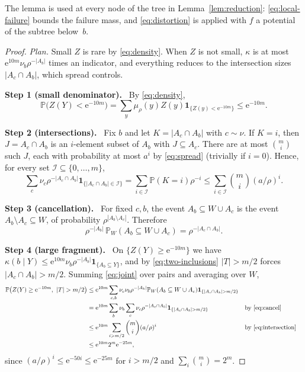 \documentclass[11pt]{article}
\numberwithin{equation}{section}
\newcommand{\PP}{\mathbb P}
\newcommand{\ind}{\mathbf 1}
\newcommand{\ee}{\mathrm e}
\newcommand{\step}[1]{\par\smallskip\noindent\textbf{Step #1.}\ }
\begin{document}
The lemma is used at every node of the tree in Lemma~\ref{lem:reduction}:
\eqref{eq:local-failure} bounds the failure mass, and
\eqref{eq:distortion} is applied with $f$ a potential of the subtree
below~$b$.

\begin{proof}
\emph{Plan.} Small $Z$ is rare by \eqref{eq:density}. When $Z$ is not
small, $\kappa$ is at most $\ee^{10m}\nu_b\rho^{-|A_b|}$ times an
indicator, and everything reduces to the intersection sizes
$|A_c\cap A_b|$, which spread controls.

\step{1 (small denominator)} By \eqref{eq:density},
\[
 \PP\bigl(Z(Y)<\ee^{-10m}\bigr)
 =\sum_{y}\mu_\rho(y)Z(y)\ind_{\{Z(y)<\ee^{-10m}\}}\le\ee^{-10m}.
\]

\step{2 (intersections)} Fix $b$ and let $K=|A_c\cap A_b|$ with
$c\sim\nu$. If $K=i$, then $J=A_c\cap A_b$ is an $i$-element subset of
$A_b$ with $J\subseteq A_c$. There are at most $\binom mi$ such $J$, each
with probability at most $a^i$ by \eqref{eq:spread} (trivially if $i=0$).
Hence, for every set $\mathcal I\subseteq\{0,\ldots,m\}$,
\begin{equation}\label{eq:intersection}
 \sum_c\nu_c\rho^{-|A_c\cap A_b|}\ind_{\{|A_c\cap A_b|\in\mathcal I\}}
 =\sum_{i\in\mathcal I}\PP(K=i)\rho^{-i}
 \le\sum_{i\in\mathcal I}\binom mi(a/\rho)^i.
\end{equation}

\step{3 (cancellation)} For fixed $c,b$, the event
$A_b\subseteq W\cup A_c$ is the event $A_b\setminus A_c\subseteq W$, of
probability $\rho^{|A_b\setminus A_c|}$. Therefore
\begin{equation}\label{eq:cancel}
 \rho^{-|A_b|}\,\PP_W(A_b\subseteq W\cup A_c)=\rho^{-|A_c\cap A_b|}.
\end{equation}

\step{4 (large fragment)} On $\{Z(Y)\ge\ee^{-10m}\}$ we have
$\kappa(b\mid Y)\le\ee^{10m}\nu_b\rho^{-|A_b|}\ind_{\{A_b\subseteq Y\}}$,
and by \eqref{eq:two-inclusions} $|T|>m/2$ forces $|A_c\cap A_b|>m/2$.
Summing \eqref{eq:joint} over pairs and averaging over $W$,
\begin{align*}
 \PP\bigl(Z(Y)\ge\ee^{-10m},\ |T|>m/2\bigr)
 &\le\ee^{10m}\sum_{c,b}\nu_c\nu_b\rho^{-|A_b|}
   \PP_W(A_b\subseteq W\cup A_c)\ind_{\{|A_c\cap A_b|>m/2\}}\\
 &=\ee^{10m}\sum_b\nu_b\sum_c\nu_c\rho^{-|A_c\cap A_b|}
   \ind_{\{|A_c\cap A_b|>m/2\}}
   &&\text{by \eqref{eq:cancel}}\\
 &\le\ee^{10m}\sum_{i>m/2}\binom mi(a/\rho)^i
   &&\text{by \eqref{eq:intersection}}\\
 &\le\ee^{10m}2^m\ee^{-25m},
\end{align*}
since $(a/\rho)^i\le\ee^{-50i}\le\ee^{-25m}$ for $i>m/2$ and
$\sum_i\binom mi=2^m$.


\end{proof}
\end{document}
